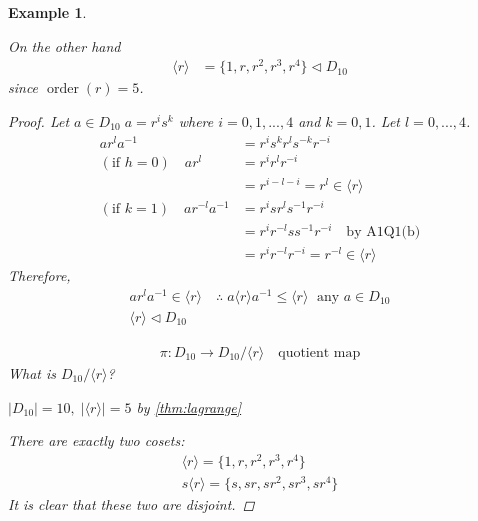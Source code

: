 \documentclass[11pt, oneside]{book}
\theoremstyle{break}
\newtheorem*{proof}{Proof}
\newtheorem{eg}{Example}[section]
\DeclareMathOperator{\order}{order}
\begin{document}
\begin{eg}
\begin{enumerate}
            On the other hand
            \begin{align*}
                \langle r \rangle &= \{1, r, r^2, r^3, r^4 \} \triangleleft D_{10}
            \end{align*}
            since $\order(r) = 5$.

            \begin{proof}
                Let $a \in D_{10} \; a = r^i s^k$ where $i = 0, 1, ..., 4$ and $k = 0, 1$. Let $l = 0, ..., 4$.
                \begin{align*}
                    a r^l a^{-1} &= r^i s^k r^l s^{-k} r^{-i} \\
                    (\text{if } h = 0) \quad ar^l &= r^i r^l r^{-i} \\
                            &= r^{i - l - i} = r^l \in \langle r \rangle \\
                    (\text{if } k = 1) \quad ar^{-l}a^{-1} &= r^i sr^l s^{-1} r^{-i} \\
                        &= r^i r^{-l} ss^{-1} r^{-i} \quad \text{by A1Q1(b)} \\
                        &= r^ir^{-l}r^{-i} = r^{-l} \in \langle r \rangle
                \end{align*}
                Therefore,
                \begin{gather*}
                    ar^la^{-1} \in \langle r \rangle \quad \therefore \; a \langle r \rangle a^{-1} \leq \langle r \rangle \; \text{ any $a \in D_{10}$} \\
                    \langle r \rangle \triangleleft D_{10}
                \end{gather*}

                \begin{gather*}
                    \pi : D_{10} \to D_{10}/\langle r \rangle \quad \text{quotient map}
                \end{gather*}
                What is $D_{10}/\langle r \rangle$?

                $|D_{10}| = 10, \; |\langle r \rangle| = 5$ by \autoref{thm:lagrange}

                There are exactly two cosets:
                \begin{gather*}
                    \langle r \rangle = \{1, r, r^2, r^3, r^4 \} \\
                    s \langle r \rangle = \{s, sr, sr^2, sr^3, sr^4 \}
                \end{gather*}
                It is clear that these two are disjoint.
            \end{proof}


\end{enumerate}
\end{eg}
\end{document}
